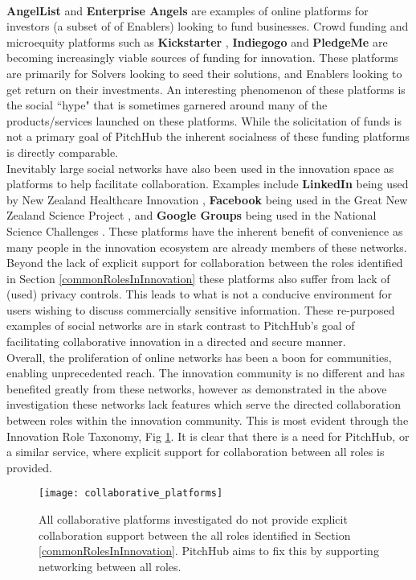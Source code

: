 \\
\newline
\textbf{AngelList} \cite{Angel:online} and \textbf{Enterprise Angels} \cite{enterpriseAngles:online} are examples of online platforms for investors (a subset of of Enablers) looking to fund businesses. Crowd funding and microequity platforms such as \textbf{Kickstarter} \cite{Kicks6:online}, \textbf{Indiegogo} \cite{Indie3:online} and \textbf{PledgeMe} \cite{Pledge:online} are becoming increasingly viable sources of funding for innovation. These platforms are primarily for Solvers looking to seed their solutions, and Enablers looking to get return on their investments. An interesting phenomenon of these platforms is the social ``hype" that is sometimes garnered around many of the products/services launched on these platforms. While the solicitation of funds is not a primary goal of PitchHub the inherent socialness of these funding platforms is directly comparable.
\\
\newline
Inevitably large social networks have also been used in the innovation space as platforms to help facilitate collaboration. Examples include \textbf{LinkedIn} \cite{Linkedin:online} being used by New Zealand Healthcare Innovation \cite{nzHealthCare:online}, \textbf{Facebook} \cite{Faceb6:online} being used in the Great New Zealand Science Project \cite{greatNZScience:online}, and \textbf{Google Groups} \cite{Googlegroups:online} being used in the National Science Challenges \cite{nzNSC10:online}. These platforms have the inherent benefit of convenience as many people in the innovation ecosystem are already members of these networks. Beyond the lack of explicit support for collaboration between the roles identified in Section \ref{commonRolesInInnovation} these platforms also suffer from lack of (used) privacy controls. This leads to what is not a conducive environment for users wishing to discuss commercially sensitive information. These re-purposed examples of social networks are in stark contrast to PitchHub's goal of facilitating collaborative innovation in a directed and secure manner.
\\
\newline
Overall, the proliferation of online networks has been a boon for communities, enabling unprecedented reach. The innovation community is no different and has benefited greatly from these networks, however as demonstrated in the above investigation these networks lack features which serve the directed collaboration between roles within the innovation community. This is most evident through the Innovation Role Taxonomy, Fig \ref{fig:collaborative_platforms}. It is clear that there is a need for PitchHub, or a similar service, where explicit support for collaboration between all roles is provided.

\begin{figure}[ht]
    \centering
    \texttt{[image: collaborative\_platforms]}
    \caption{All collaborative platforms investigated do not provide explicit collaboration support between the all roles identified in Section \ref{commonRolesInInnovation}. PitchHub aims to fix this by supporting networking between all roles. }
    \label{fig:collaborative_platforms}
\end{figure}
